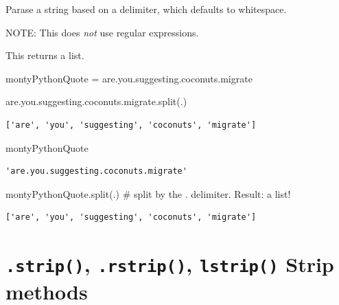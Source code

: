 \documentclass[
  letterpaper,
  DIV=11,
  numbers=noendperiod]{scrreprt}
\newenvironment{Shaded}{\begin{snugshade}}{\end{snugshade}}
\newcommand{\CommentTok}[1]{\textcolor[rgb]{0.37,0.37,0.37}{#1}}
\newcommand{\NormalTok}[1]{\textcolor[rgb]{0.00,0.23,0.31}{#1}}
\newcommand{\OperatorTok}[1]{\textcolor[rgb]{0.37,0.37,0.37}{#1}}
\newcommand{\StringTok}[1]{\textcolor[rgb]{0.13,0.47,0.30}{#1}}
\begin{document}
Parase a string based on a delimiter, which defaults to whitespace.

NOTE: This does \emph{not} use regular expressions.

This returns a list.

\begin{Shaded}
\begin{Highlighting}[]
\NormalTok{montyPythonQuote }\OperatorTok{=} \StringTok{\textquotesingle{}are.you.suggesting.coconuts.migrate\textquotesingle{}}
\end{Highlighting}
\end{Shaded}

\begin{Shaded}
\begin{Highlighting}[]
\CommentTok{\textquotesingle{}are.you.suggesting.coconuts.migrate\textquotesingle{}}\NormalTok{.split(}\StringTok{\textquotesingle{}.\textquotesingle{}}\NormalTok{)}
\end{Highlighting}
\end{Shaded}

\begin{verbatim}
['are', 'you', 'suggesting', 'coconuts', 'migrate']
\end{verbatim}

\begin{Shaded}
\begin{Highlighting}[]
\NormalTok{montyPythonQuote}
\end{Highlighting}
\end{Shaded}

\begin{verbatim}
'are.you.suggesting.coconuts.migrate'
\end{verbatim}

\begin{Shaded}
\begin{Highlighting}[]
\NormalTok{montyPythonQuote.split(}\StringTok{\textquotesingle{}.\textquotesingle{}}\NormalTok{) }\CommentTok{\# split by the \textquotesingle{}.\textquotesingle{} delimiter. Result: a list!}
\end{Highlighting}
\end{Shaded}

\begin{verbatim}
['are', 'you', 'suggesting', 'coconuts', 'migrate']
\end{verbatim}

\hypertarget{strip-.rstrip-lstrip-strip-methods}{%
\section{\texorpdfstring{\texttt{.strip()}, \texttt{.rstrip()},
\texttt{lstrip()} Strip
methods}{.strip(), .rstrip(), lstrip() Strip methods}}\label{strip-.rstrip-lstrip-strip-methods}}
\end{document}
